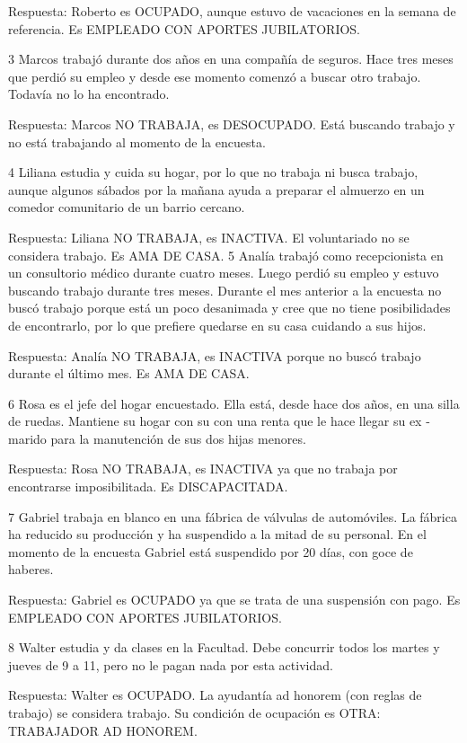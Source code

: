 \documentclass[
  openany]{book}
\begin{document}
Respuesta: Roberto es OCUPADO, aunque estuvo de vacaciones en la semana de referencia. Es EMPLEADO CON APORTES JUBILATORIOS.

3 Marcos trabajó durante dos años en una compañía de seguros. Hace tres meses que perdió su empleo y desde ese momento comenzó a buscar otro trabajo. Todavía no lo ha encontrado.

Respuesta: Marcos NO TRABAJA, es DESOCUPADO. Está buscando trabajo y no está trabajando al momento de la encuesta.

4 Liliana estudia y cuida su hogar, por lo que no trabaja ni busca trabajo, aunque algunos sábados por la mañana ayuda a preparar el almuerzo en un comedor comunitario de un barrio cercano.

Respuesta: Liliana NO TRABAJA, es INACTIVA. El voluntariado no se considera trabajo. Es AMA DE CASA. 5 Analía trabajó como recepcionista en un consultorio médico durante cuatro meses. Luego perdió su empleo y estuvo buscando trabajo durante tres meses. Durante el mes anterior a la encuesta no buscó trabajo porque está un poco desanimada y cree que no tiene posibilidades de encontrarlo, por lo que prefiere quedarse en su casa cuidando a sus hijos.

Respuesta: Analía NO TRABAJA, es INACTIVA porque no buscó trabajo durante el último mes. Es AMA DE CASA.

6 Rosa es el jefe del hogar encuestado. Ella está, desde hace dos años, en una silla de ruedas. Mantiene su hogar con su con una renta que le hace llegar su ex - marido para la manutención de sus dos hijas menores.

Respuesta: Rosa NO TRABAJA, es INACTIVA ya que no trabaja por encontrarse imposibilitada. Es DISCAPACITADA.

7 Gabriel trabaja en blanco en una fábrica de válvulas de automóviles. La fábrica ha reducido su producción y ha suspendido a la mitad de su personal. En el momento de la encuesta Gabriel está suspendido por 20 días, con goce de haberes.

Respuesta: Gabriel es OCUPADO ya que se trata de una suspensión con pago. Es EMPLEADO CON APORTES JUBILATORIOS.

8 Walter estudia y da clases en la Facultad. Debe concurrir todos los martes y jueves de 9 a 11, pero no le pagan nada por esta actividad.

Respuesta: Walter es OCUPADO. La ayudantía ad honorem (con reglas de trabajo) se considera trabajo. Su condición de ocupación es OTRA: TRABAJADOR AD HONOREM.
\end{document}

